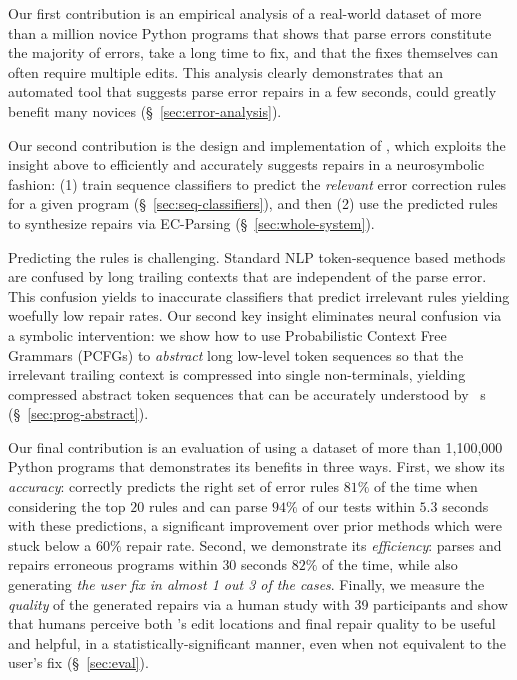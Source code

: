 %
Our first contribution is an empirical analysis of a real-world
dataset of more than a million novice Python programs that shows
that parse errors constitute the majority of errors, take a long
time to fix, and that the fixes themselves can often require
multiple edits.
%
This analysis clearly demonstrates that an automated tool that
suggests parse error repairs in a few seconds, could greatly
benefit many novices (\S~\ref{sec:error-analysis}).

%
Our second contribution is the design and implementation
of \toolname, which exploits the insight above to
efficiently and accurately suggests repairs in a
neurosymbolic fashion:
%
(1) train sequence classifiers to predict the \emph{relevant}
error correction rules for a given program (\S~\ref{sec:seq-classifiers}), and then
%
(2) use the predicted rules to synthesize repairs
via EC-Parsing (\S~\ref{sec:whole-system}).

%
Predicting the rules is challenging.
Standard NLP token-sequence based
methods are confused by long
trailing contexts that are
independent of the parse error.
%
This confusion yields to inaccurate
classifiers that predict irrelevant
rules yielding woefully low repair rates.
%
Our second key insight eliminates neural confusion
via a symbolic intervention: we show how to use
Probabilistic Context Free Grammars (PCFGs)
to \emph{abstract} long low-level token
sequences so that the irrelevant trailing
context is compressed into single non-terminals,
yielding compressed abstract token sequences
that can be accurately understood by \dnn~s
(\S~\ref{sec:prog-abstract}).

%
Our final contribution is an evaluation of \toolname
using a dataset of more than 1,100,000 Python programs
that demonstrates its benefits in three ways.
%
First, we show its \emph{accuracy}: \toolname correctly predicts
the right set of error rules $81\%$ of the time when considering the top $20$
rules and can parse $94\%$ of our tests within $5.3$ seconds with these
predictions, a significant improvement over prior methods
which were stuck below a $60\%$ repair rate.
%
Second, we demonstrate its \emph{efficiency}: \toolname
parses and repairs erroneous programs within $30$ seconds $82\%$ of the time,
while also generating \emph{the user fix in almost 1 out 3 of the cases}.
%
Finally, we measure the \emph{quality} of the generated repairs via a human study
with 39 participants and show that humans perceive both \toolname's edit
locations and final repair quality to be useful and helpful,
in a statistically-significant manner, even when not equivalent to the user's fix (\S~\ref{sec:eval}).

